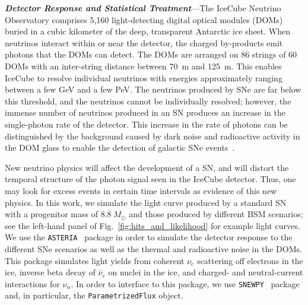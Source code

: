 
\textbf{\textit{Detector Response and Statistical Treatment}}---The IceCube Neutrino Observatory comprises 5,160 light-detecting digital optical modules (DOMs) buried in a cubic kilometer of the deep, transparent Antarctic ice sheet.
When neutrinos interact within or near the detector, the charged by-products emit photons that the DOMs can detect.
The DOMs are arranged on 86 strings of 60 DOMs with an inter-string distance between 70~m and 125~m.
This enables IceCube to resolve individual neutrinos with energies approximately ranging between a few GeV and a few PeV.
The neutrinos produced by SNe are far below this threshold, and the neutrinos cannot be individually resolved; however, the immense number of neutrinos produced in an SN produces an increase in the single-photon rate of the detector.
This increase in the rate of photons can be distinguished by the background caused by dark noise and radioactive activity in the DOM glass to enable the detection of galactic SNe events~\cite{Griswold:2023iwz}.

New neutrino physics will affect the development of a SN, and will distort the temporal structure of the photon signal seen in the IceCube detector.
Thus, one may look for excess events in certain time intervals as evidence of this new physics.
In this work, we simulate the light curve produced by a standard SN with a progenitor mass of $8.8~M_{\odot}$ and those produced by different BSM scenarios; see the left-hand panel of Fig.~\ref{fig:hits_and_likelihood} for example light curves.
We use the \texttt{ASTERIA}~\cite{spencer_griswold_2020_3926835} package in order to simulate the detector response to the different SNe scenarios as well as the thermal and radioactive noise in the DOMs.  
This package simulates light yields from coherent $\nu_{e}$ scattering off electrons in the ice, inverse beta decay of $\bar{\nu}_{e}$ on nuclei in the ice, and charged- and neutral-current interactions for $\nu_{\alpha}$.
In order to interface to this package, we use \texttt{SNEWPY}~\cite{baxter2021snewpy} package and, in particular, the \texttt{ParametrizedFlux} object.

